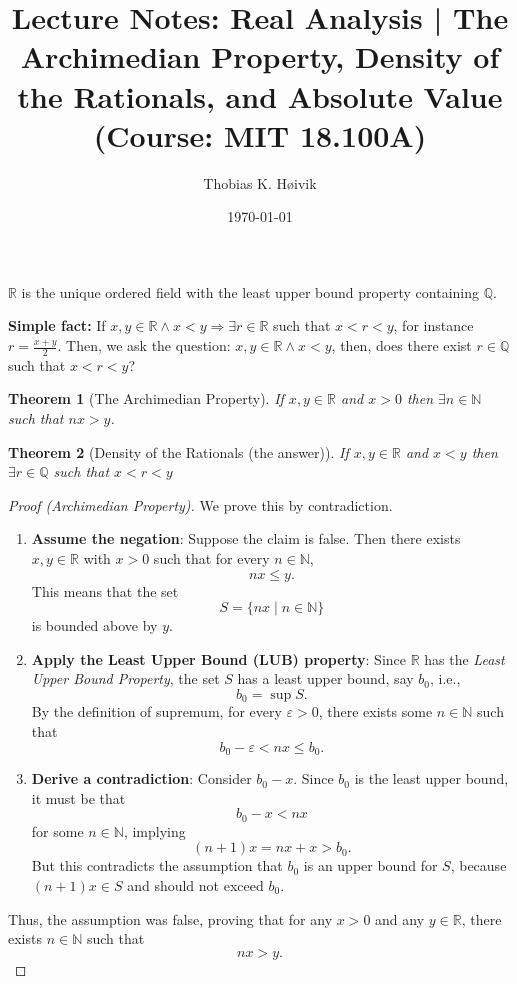 \documentclass[12pt]{article}
\title{Lecture Notes: Real Analysis | The Archimedian Property, Density of the Rationals, and Absolute Value (Course: MIT 18.100A)}
\author{Thobias K. Høivik}
\date{\today}
\newtheorem{theorem}{Theorem}
\begin{document}
\maketitle
\noindent 
\(\mathbb R\) is the unique ordered field with the least upper bound property 
containing \(\mathbb Q\).

\noindent 
\textbf{Simple fact: }
If \(x,y \in \mathbb R \land x < y \Rightarrow \exists r \in \mathbb R\) such that 
\(x < r < y\), for instance \(r = \frac{x+y}{2}\).
Then, we ask the question: \(x,y \in \mathbb R \land x < y\), then, does there 
exist \(r \in \mathbb Q\) such that \(x< r < y\)?

\noindent 
\begin{theorem}[The Archimedian Property]
    If \(x,y \in \mathbb R\) and \(x > 0\) then \(\exists n \in \mathbb N\) such 
    that \(nx > y \). 
\end{theorem}

\begin{theorem}[Density of the Rationals (the answer)]
    If \(x,y \in \mathbb R\) and \(x < y\) then \(\exists r \in \mathbb Q\)
    such that \(x < r < y\)
\end{theorem}
\begin{proof}[Proof (Archimedian Property)]
We prove this by contradiction.

\begin{enumerate}
    \item \textbf{Assume the negation}:  
    Suppose the claim is false. Then there exists \( x, y \in \mathbb{R} \) with \( x > 0 \) such that for every \( n \in \mathbb{N} \),
    \[
    nx \leq y.
    \]
    This means that the set
    \[
    S = \{ nx \mid n \in \mathbb{N} \}
    \]
    is bounded above by \( y \).

    \item \textbf{Apply the Least Upper Bound (LUB) property}:  
    Since \( \mathbb{R} \) has the \textit{Least Upper Bound Property}, the set \( S \) has a least upper bound, say \( b_0 \), i.e.,
    \[
    b_0 = \sup S.
    \]
    By the definition of supremum, for every \( \varepsilon > 0 \), there exists some \( n \in \mathbb{N} \) such that
    \[
    b_0 - \varepsilon < nx \leq b_0.
    \]

    \item \textbf{Derive a contradiction}:  
    Consider \( b_0 - x \). Since \( b_0 \) is the least upper bound, it must be that
    \[
    b_0 - x < nx
    \]
    for some \( n \in \mathbb{N} \), implying
    \[
    (n+1)x = nx + x > b_0.
    \]
    But this contradicts the assumption that \( b_0 \) is an upper bound for \( S \), because \( (n+1)x \in S \) and should not exceed \( b_0 \).

\end{enumerate}

\noindent
Thus, the assumption was false, proving that for any \( x > 0 \) and any \( y \in \mathbb{R} \), there exists \( n \in \mathbb{N} \) such that  
\[
nx > y.
\]
\end{proof}
\end{document}
